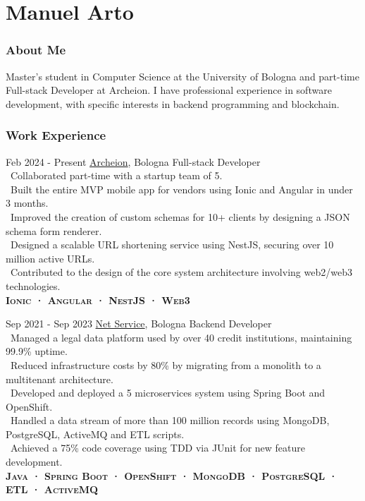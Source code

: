 \documentclass{tccv}
\begin{document}
\part{Manuel Arto}

\section{About Me}

Master's student in Computer Science at the University of Bologna and part-time Full-stack Developer at Archeion.\newline
I have professional experience in software development, with specific interests in backend programming and blockchain. 

\section{Work Experience}

\begin{eventlist}

     \item{Feb 2024 - Present}
     {\href{https://archeion.tech/}{Archeion}, Bologna}
     {Full-stack Developer} \\
     \textbullet~Collaborated part-time with a startup team of 5. \\
     \textbullet~Built the entire MVP mobile app for vendors using Ionic and Angular in under 3 months. \\
     \textbullet~Improved the creation of custom schemas for 10+ clients by designing a JSON schema form renderer. \\
     \textbullet~Designed a scalable URL shortening service using NestJS, securing over 10 million active URLs. \\
     \textbullet~Contributed to the design of the core system architecture involving web2/web3 technologies. \\
     \textbf{\textsc{Ionic · Angular · NestJS · Web3}}

     \item{Sep 2021 - Sep 2023}
     {\href{https://www.netservice.eu/}{Net Service}, Bologna}
     {Backend Developer} \\
     \textbullet~Managed a legal data platform used by over 40 credit institutions, maintaining 99.9\% uptime. \\
     \textbullet~Reduced infrastructure costs by 80\% by migrating from a monolith to a multitenant architecture. \\
     \textbullet~Developed and deployed a 5 microservices system using Spring Boot and OpenShift. \\
     \textbullet~Handled a data stream of more than 100 million records using MongoDB, PostgreSQL, ActiveMQ and ETL scripts. \\
     \textbullet~Achieved a 75\% code coverage using TDD via JUnit for new feature development. \\
     \textbf{\textsc{Java · Spring Boot · OpenShift · MongoDB · PostgreSQL · ETL · ActiveMQ}}

\end{eventlist}
\end{document}
